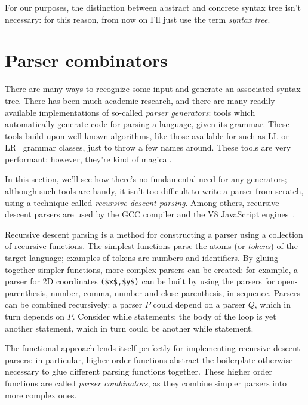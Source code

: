 \documentclass[UdineBachThesis,american,11pt]{PhdThesis}
\begin{document}
  For our purposes, the distinction between abstract and concrete syntax tree
  isn't necessary: for this reason, from now on I'll just use the term
  \emph{syntax tree}.

  \section{Parser combinators}
  \label{section:parser-combinators}

  There are many ways to recognize some input and generate an associated syntax
  tree. There has been much academic research, and there are many readily
  available implementations of so-called \emph{parser generators}: tools which
  automatically generate code for parsing a language, given its grammar. These
  tools build upon well-known algorithms, like those available for such as LL or
  LR~\cite{lr} grammar classes, just to throw a few names around. These tools
  are very performant; however, they're kind of magical.

  In this section, we'll see how there's no fundamental need for any generators;
  although such tools are handy, it isn't too difficult to write a parser from
  scratch, using a technique called \emph{recursive descent parsing}. Among
  others, recursive descent parsers are used by the GCC compiler and the V8
  JavaScript engines~\cite{recursive-descent-parsing}.

  Recursive descent parsing is a method for constructing a parser using a
  collection of recursive functions. The simplest functions parse the atoms (or
  \emph{tokens}) of the target language; examples of tokens are numbers and
  identifiers. By gluing together simpler functions, more complex parsers can be
  created: for example, a parser for 2D coordinates
  \lstinline[mathescape]@($x$,$y$)@ can be built by using the parsers for
  open-parenthesis, number, comma, number and close-parenthesis, in sequence.
  Parsers can be combined recursively: a parser $P$ could depend on a parser
  $Q$, which in turn depends on $P$\@. Consider while statements: the body of
  the loop is yet another statement, which in turn could be another while
  statement.

  The functional approach lends itself perfectly for implementing recursive
  descent parsers: in particular, higher order functions abstract the
  boilerplate otherwise necessary to glue different parsing functions together.
  These higher order functions are called \emph{parser combinators}, as they
  combine simpler parsers into more complex ones.
\end{document}
